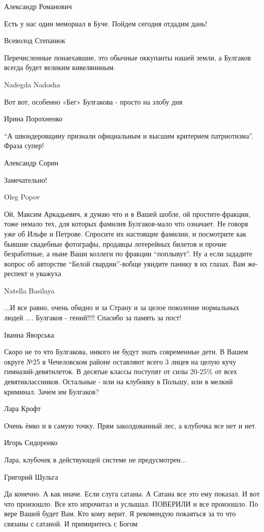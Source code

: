 Александр Романович

Есть у нас один мемориал в Буче. Пойдем сегодня отдадим дань!

Всеволод Степанюк

Перечисленные понаехавшие, это обычные оккупанты нашей земли, а Булгаков всегда
будет великим кивеляниным.

Nadegda Nadosha

Вот вот, особенно «Бег» Булгакова - просто на злобу дня

Ирина Порохненко

\enquote{А швондеровщину признали официальным и высшим критерием патриотизма}.
Фраза супер!

Александр Сорин

Замечательно!

Oleg Popov

Ой, Максим Аркадьевич, я думаю что и в Вашей шобле, ой простите-фракции, тоже
немало тех, для которых фамилия Булгаков-мало что означает. Не говоря уже об
Ильфе и Петрове. Спросите их настоящие фамилии, и посмотрите как бывшие
свадебные фотографы, продавцы лотерейных билетов и прочие безработные, а ныне
Ваши коллеги по фракции \enquote{поплывут}. Ну а если зададите вопрос об авторстве
\enquote{Белой гвардии}-вобще увидите панику в их глазах. Вам же-респект и уважуха

Natella Basilaya

...И все равно, очень обидно и за Страну и за целое поколение нормальных людей
.... Булгаков - гений!!!! Спасибо за память за пост!

Іванна Яворська

Скоро не то что Булгакова, никого не будут знать современные дети. В Вашем
округе №25 в Чечеловском районе оставляют всего 3 лицея на целую кучу
гимназий-девятилеток. В десятые классы поступят от силы 20-25\% от всех
девятиклассников. Остальные - или на клубнику в Польшу, или в мелкий криминал.
Зачем им Булгаков?

Лара Крофт

Очень ёмко и в самую точку. Прям заколдованный лес, а клубочка все нет и нет.

Игорь Сидоренко

Лара, клубочек в действующей системе не предусмотрен...

Григорий Шульга

Да конечно. А как иначе. Если слуга сатаны. А Сатана все это ему показал.  И
вот что произошло. Все кто ипрочитал и услышал. ПОВЕРИЛИ и все произошло.  По
вере Вашей будет Вам.  Кто кому верит.  Я рекомендую покаяться за то что
связаны с сатаной. И примиритесь с Богом

